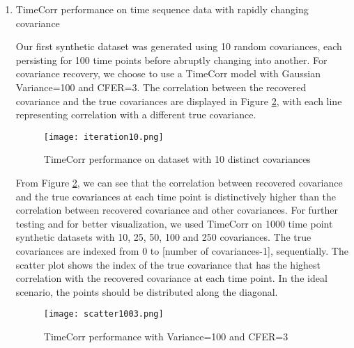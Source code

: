 \documentclass[12pt]{article}
\begin{document}
\begin{enumerate}
\begin{figure}[h]
\caption{Varying CFER}
\centering
\texttt{[image: VaryingCFER.png]}
\label{fig:VaryingCFER}
\end{figure}
From Figure \ref{fig:VaryingCFER}, we see that there is not a huge difference in TimeCorr performance when using CFER of 3 to 25. However, as CFER increases beyond 51, we start to see abnormalities on the edges of the graphs. In addition, we suspect that TimeCorr models with large CFER values do not perform well on time sequence datasets with rapidly changing dynamic covariances. This is verified in the following section.\par
\item TimeCorr performance on time sequence data with rapidly changing covariance\par
Our first synthetic dataset was generated using 10 random covariances, each persisting for 100 time points before abruptly changing into another. For covariance recovery, we choose to use a TimeCorr model with Gaussian Variance=100 and CFER=3. The correlation between the recovered covariance and the true covariances are displayed in Figure \ref{fig:iteration10}, with each line representing correlation with a different true covariance.\par
\begin{figure}[h]
\caption{TimeCorr performance on dataset with 10 distinct covariances}
\centering
\texttt{[image: iteration10.png]}
\label{fig:iteration10}
\end{figure}
From Figure \ref{fig:iteration10}, we can see that the correlation between recovered covariance and the true covariances at each time point is distinctively higher than the correlation between recovered covariance and other covariances. For further testing and for better visualization, we used TimeCorr on 1000 time point synthetic datasets with 10, 25, 50, 100 and 250 covariances. The true covariances are indexed from 0 to [number of covariances-1], sequentially. The scatter plot shows the index of the true covariance that has the highest correlation with the recovered covariance at each time point. In the ideal scenario, the points should be distributed along the diagonal.\par
\begin{figure}[h]
\caption{TimeCorr performance with Variance=100 and CFER=3}
\centering
\texttt{[image: scatter1003.png]}
\label{fig:scatter1003}
\end{figure}

\end{enumerate}
\end{document}
